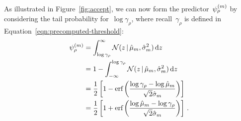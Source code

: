 \documentclass[angelino.tex]{subfiles}
\begin{document}
%
\noi As illustrated in Figure~\ref{fig:accept}, we can now form the
predictor~$\psi_{\rho}^{(m)}$ by considering the tail probability
for~$\log \gamma_\rho$, where recall~$\gamma_\rho$ is defined in
Equation~\ref{eqn:precomputed-threshold}:
\begin{align}
\psi_{\rho}^{(m)} &= \int^\infty_{\log \gamma_\rho}
{\mathcal N}(z\,|\, \hat{\mu}_m, \hat{\sigma}_m^2)\,\mathrm{d}z\\
&= 1 - \int_{-\infty}^{\log \gamma_\rho} {\mathcal N}(z\,|\, \hat{\mu}_m, \hat{\sigma}_m^2)\,\mathrm{d}z \nonumber \\
&=\frac{1}{2} \left[
1 - \text{erf}\left( \frac{\log \gamma_\rho - \log\hat{\mu}_m}{\sqrt{2}\hat{\sigma}_m}\right)
\right] \nonumber \\
&= \frac{1}{2}\left[
1 + \text{erf}\left( \frac{\log\hat{\mu}_m - \log \gamma_\rho}{\sqrt{2}\hat{\sigma}_m}\right)
\right]\,.
\label{eqn:subset}
\end{align}
\end{document}
